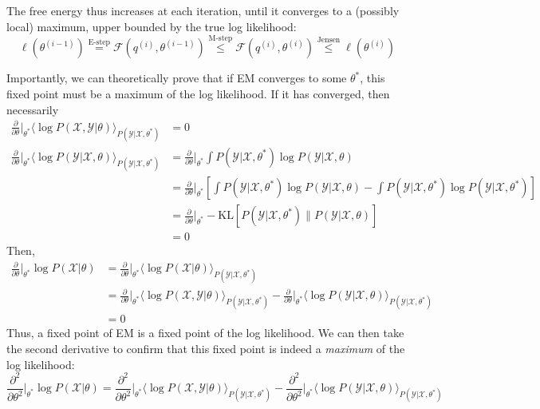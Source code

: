 \documentclass[a4paper]{article}
\begin{document}
The free energy thus increases at each iteration, until it converges to a (possibly local) maximum, upper bounded by the true log likelihood:
\[\ell(\theta^{(i-1)}) \overset{\textrm{E-step}}{=} \mathcal{F}(q^{(i)},\theta^{(i-1)}) \overset{\textrm{M-step}}{\leq} \mathcal{F}(q^{(i)},\theta^{(i)}) \overset{\textrm{Jensen}}{\leq} \ell(\theta^{(i)})\]

Importantly, we can theoretically prove that if EM converges to some $\theta^*$, this fixed point must be a maximum of the log likelihood. If it has converged, then necessarily
\begin{align*}
\frac{\partial}{\partial \theta}\Bigr|_{\theta^*}\langle\log P(\mathcal{X},\mathcal{Y}|\theta)\rangle_{P(\mathcal{Y}|\mathcal{X},\theta^*)} &= 0 \\
\frac{\partial}{\partial \theta}\Bigr|_{\theta^*}\langle\log P(\mathcal{Y}|\mathcal{X},\theta)\rangle_{P(\mathcal{Y}|\mathcal{X},\theta^*)} &= \frac{\partial}{\partial \theta}\Bigr|_{\theta^*} \int P(\mathcal{Y}|\mathcal{X},\theta^*)\log P(\mathcal{Y}|\mathcal{X},\theta) \\
&= \frac{\partial}{\partial \theta}\Bigr|_{\theta^*} \left[ \int P(\mathcal{Y}|\mathcal{X},\theta^*)\log P(\mathcal{Y}|\mathcal{X},\theta) - \int P(\mathcal{Y}|\mathcal{X},\theta^*)\log P(\mathcal{Y}|\mathcal{X},\theta^*) \right] \\
&= \frac{\partial}{\partial \theta}\Bigr|_{\theta^*} -\textrm{KL}[P(\mathcal{Y}|\mathcal{X},\theta^*)\|P(\mathcal{Y}|\mathcal{X},\theta)] \\
&= 0
\end{align*}
Then,
\begin{align*}
\frac{\partial}{\partial \theta}\Bigr|_{\theta^*}\log P(\mathcal{X}|\theta) &= \frac{\partial}{\partial \theta}\Bigr|_{\theta^*}\langle\log P(\mathcal{X}|\theta)\rangle_{P(\mathcal{Y}|\mathcal{X},\theta^*)} \\
&= \frac{\partial}{\partial \theta}\Bigr|_{\theta^*}\langle\log P(\mathcal{X,Y}|\theta)\rangle_{P(\mathcal{Y}|\mathcal{X},\theta^*)} - \frac{\partial}{\partial \theta}\Bigr|_{\theta^*}\langle\log P(\mathcal{Y}|\mathcal{X},\theta)\rangle_{P(\mathcal{Y}|\mathcal{X},\theta^*)} \\
&= 0
\end{align*}
Thus, a fixed point of EM is a fixed point of the log likelihood. We can then take the second derivative to confirm that this fixed point is indeed a \emph{maximum} of the log likelihood:
\[ \frac{\partial^2}{\partial \theta^2}\Bigr|_{\theta^*}\log P(\mathcal{X}|\theta) = \frac{\partial^2}{\partial \theta^2}\Bigr|_{\theta^*}\langle\log P(\mathcal{X,Y}|\theta)\rangle_{P(\mathcal{Y}|\mathcal{X},\theta^*)} - \frac{\partial^2}{\partial \theta^2}\Bigr|_{\theta^*}\langle\log P(\mathcal{Y}|\mathcal{X},\theta)\rangle_{P(\mathcal{Y}|\mathcal{X},\theta^*)} \]
\end{document}

